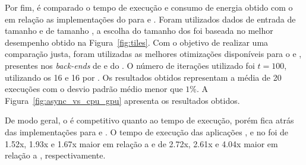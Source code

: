 Por fim, é comparado o tempo de execução e consumo de energia obtido com o \pskelmppa \async em relação as implementações do \pskel para \cpu e \gpu. Foram utilizados dados de entrada de tamanho \ind e \tiles de tamanho \tiled, a escolha do tamanho dos \tiles foi baseada no melhor desempenho obtido na Figura~\ref{fig:tiles}. Com o objetivo de realizar uma comparação justa, foram utilizadas as melhores otimizações disponíveis para o \xeon e \tesla, presentes nos \textit{back-ends} de \multicore e \gpu do \pskel. O número de iterações utilizado foi $t = 100$, utilizando os 16 \clusters e 16 \pes por \cluster. Os resultados obtidos representam a média de 20 execuções com o desvio padrão médio menor que $1\%$. A Figura~\ref{fig:async_vs_cpu_gpu} apresenta os resultados obtidos.



De modo geral, o \pskelmppa \async é competitivo quanto ao tempo de execução, porém fica atrás das implementações para \cpu e \gpu. O tempo de execução das aplicações \convolution, \gol e \jacobi no \mppa foi de 1.52x, 1.93x e 1.67x maior em relação a \cpu e de 2.72x, 2.61x e 4.04x maior em relação a \gpu, respectivamente.

